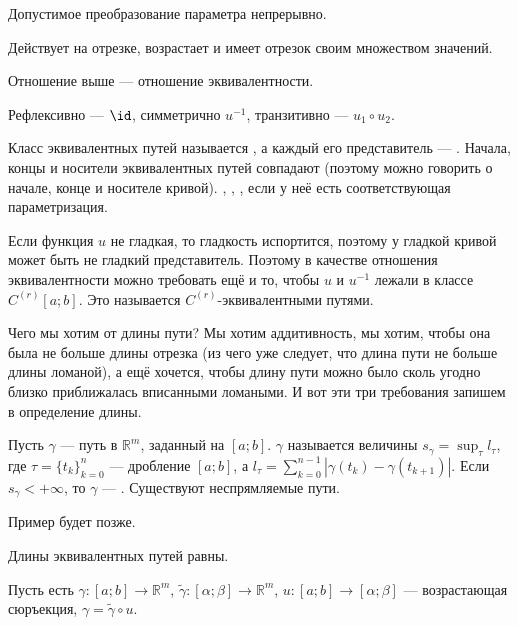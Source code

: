 \documentclass{article}
\begin{document}
\begin{itemize}
        \thm Допустимое преобразование параметра непрерывно.
        \begin{Proof}
            Действует на отрезке, возрастает и имеет отрезок своим множеством значений.
        \end{Proof}
        \thm Отношение выше --- отношение эквивалентности.
        \begin{Proof}
            Рефлексивно --- $\id$, симметрично $u^{-1}$, транзитивно --- $u_1\circ u_2$.
        \end{Proof}
        \dfn Класс эквивалентных путей называется , а каждый его представитель --- .
        \thm Начала, концы и носители эквивалентных путей совпадают (поэтому можно говорить о начале, конце и носителе кривой).
        \dfn {}, , , если у неё есть соответствующая параметризация.
        \begin{Comment}
            Если функция $u$ не гладкая, то гладкость испортится, поэтому у гладкой кривой может быть не гладкий представитель. Поэтому в качестве отношения эквивалентности можно требовать ещё и то, чтобы $u$ и $u^{-1}$ лежали в классе $C^{(r)}[a;b]$. Это называется $C^{(r)}$-эквивалентными путями.
        \end{Comment}
        \begin{Comment}
            Чего мы хотим от длины пути? Мы хотим аддитивность, мы хотим, чтобы она была не больше длины отрезка (из чего уже следует, что длина пути не больше длины ломаной), а ещё хочется, чтобы длину пути можно было сколь угодно близко приближалась вписанными ломаными. И вот эти три требования запишем в определение длины.
        \end{Comment}
        \dfn Пусть $\gamma$ --- путь в $\mathbb R^m$, заданный на $[a;b]$.  $\gamma$ называется величины $s_\gamma=\sup_{\tau}l_\tau$, где $\tau=\{t_k\}_{k=0}^n$ --- дробление $[a;b]$, а $l_\tau=\sum\limits_{k=0}^{n-1}|\gamma(t_k)-\gamma(t_{k+1})|$.
        \dfn Если $s_\gamma<+\infty$, то $\gamma$ --- .
        \thm Существуют неспрямляемые пути.
        \begin{Proof}
            Пример будет позже.
        \end{Proof}
        \thm Длины эквивалентных путей равны.
        \begin{Proof}
            Пусть есть $\gamma\colon[a;b]\to\mathbb R^m$, $\tilde\gamma\colon[\alpha;\beta]\to\mathbb R^m$, $u\colon[a;b]\to[\alpha;\beta]$ --- возрастающая сюръекция, $\gamma=\tilde\gamma\circ u$.\\

\end{Proof}
\end{itemize}
\end{document}
